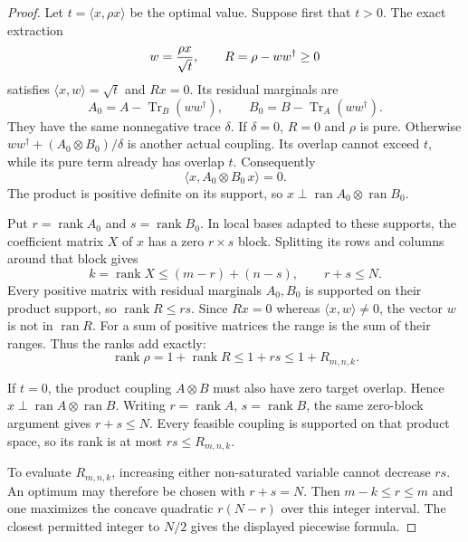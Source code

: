 \begin{proof}
Let $t=\langle x,\rho x\rangle$ be the optimal value. Suppose first that
$t>0$. The exact extraction
\[
 w={\rho x\over\sqrt t},\qquad R=\rho-ww^\dagger\ge0
\]
satisfies $\langle x,w\rangle=\sqrt t$ and $Rx=0$. Its residual
marginals are
\[
 A_0=A-\operatorname{Tr}_B(ww^\dagger),\qquad
 B_0=B-\operatorname{Tr}_A(ww^\dagger).
\]
They have the same nonnegative trace $\delta$. If $\delta=0$, $R=0$ and
$\rho$ is pure. Otherwise
$ww^\dagger+(A_0\otimes B_0)/\delta$ is another actual coupling.
Its overlap cannot exceed $t$, while its pure term already has overlap
$t$. Consequently
\[
                     \langle x,A_0\otimes B_0\,x\rangle=0.
\]
The product is positive definite on its support, so
$x\perp\operatorname{ran}A_0\otimes\operatorname{ran}B_0$.

Put $r=\operatorname{rank}A_0$ and $s=\operatorname{rank}B_0$.
In local bases adapted to these supports, the coefficient matrix $X$ of
$x$ has a zero $r\times s$ block. Splitting its rows and columns around
that block gives
\[
                k=\operatorname{rank}X\le(m-r)+(n-s),
                \qquad r+s\le N.
\]
Every positive matrix with residual marginals $A_0,B_0$ is supported on
their product support, so $\operatorname{rank}R\le rs$.
Since $Rx=0$ whereas $\langle x,w\rangle\ne0$, the vector $w$ is not in
$\operatorname{ran}R$. For a sum of positive matrices the range is the
sum of their ranges. Thus the ranks add exactly:
\[
        \operatorname{rank}\rho=1+\operatorname{rank}R
                             \le1+rs\le1+R_{m,n,k}.
\]

If $t=0$, the product coupling $A\otimes B$ must also have zero target
overlap. Hence $x\perp\operatorname{ran}A\otimes\operatorname{ran}B$.
Writing $r=\operatorname{rank}A$, $s=\operatorname{rank}B$, the same
zero-block argument gives $r+s\le N$. Every feasible coupling is
supported on that product space, so its rank is at most $rs\le R_{m,n,k}$.

To evaluate $R_{m,n,k}$, increasing either non-saturated variable cannot
decrease $rs$. An optimum may therefore be chosen with $r+s=N$.
Then $m-k\le r\le m$ and one maximizes the concave quadratic
$r(N-r)$ over this integer interval. The closest permitted integer to
$N/2$ gives the displayed piecewise formula.
\end{proof}

